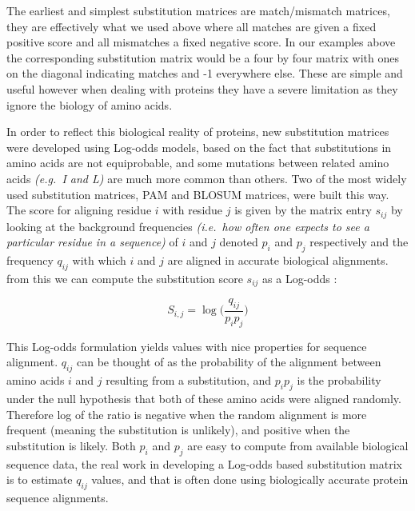 \documentclass[
  11pt,
  twoside,
  BCOR=10mm,
  listof=totoc]{scrbook}
\begin{document}
The earliest and simplest substitution matrices are match/mismatch matrices, they are effectively what we used above where all matches are given a fixed positive score and all mismatches a fixed negative score. In our examples above the corresponding substitution matrix would be a four by four matrix with ones on the diagonal indicating matches and -1 everywhere else. These are simple and useful however when dealing with proteins they have a severe limitation as they ignore the biology of amino acids.

In order to reflect this biological reality of proteins, new substitution matrices were developed using Log-odds models, based on the fact that substitutions in amino acids are not equiprobable, and some mutations between related amino acids \emph{(e.g.~I and L)} are much more common than others. Two of the most widely used substitution matrices, PAM and BLOSUM matrices, were built this way. The score for aligning residue \(i\) with residue \(j\) is given by the matrix entry \(s_{ij}\) by looking at the background frequencies \emph{(i.e.~how often one expects to see a particular residue in a sequence)} of \(i\) and \(j\) denoted \(p_i\) and \(p_j\) respectively and the frequency \(q_{ij}\) with which \(i\) and \(j\) are aligned in accurate biological alignments. from this we can compute the substitution score \(s_{ij}\) as a Log-odds \autocite{altschulSubstitutionMatrices2013}:

\[
S_{i,j}=\log\bigg(\frac{q_{ij}}{p_ip_j}\bigg)
\]

This Log-odds formulation yields values with nice properties for sequence alignment. \(q_{ij}\) can be thought of as the probability of the alignment between amino acids \(i\) and \(j\) resulting from a substitution, and \(p_ip_j\) is the probability under the null hypothesis that both of these amino acids were aligned randomly. Therefore log of the ratio is negative when the random alignment is more frequent (meaning the substitution is unlikely), and positive when the substitution is likely. Both \(p_i\) and \(p_j\) are easy to compute from available biological sequence data, the real work in developing a Log-odds based substitution matrix is to estimate \(q_{ij}\) values, and that is often done using biologically accurate protein sequence alignments.
\end{document}
